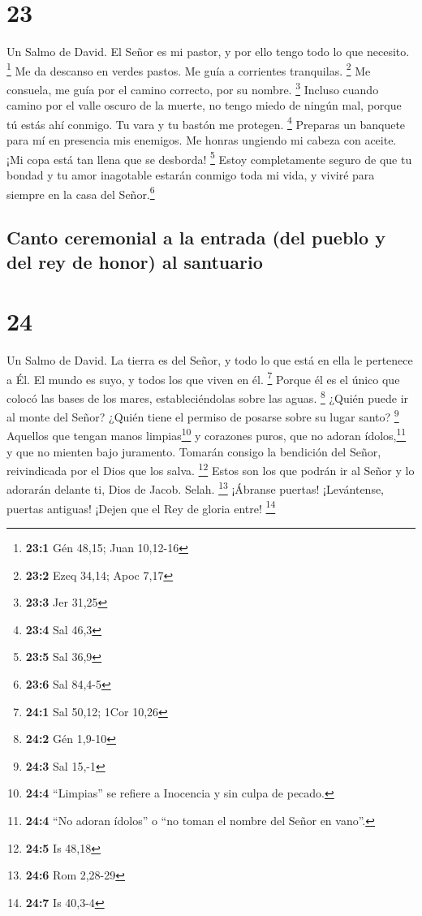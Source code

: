 \hypertarget{section-22}{%
\section{23}\label{section-22}}

Un Salmo de David.  El Señor es mi pastor, y por ello
tengo todo lo que necesito. \footnote{\textbf{23:1} Gén 48,15; Juan
  10,12-16}  Me da descanso en verdes pastos. Me guía a
corrientes tranquilas. \footnote{\textbf{23:2} Ezeq 34,14; Apoc 7,17}
 Me consuela, me guía por el camino correcto, por su
nombre. \footnote{\textbf{23:3} Jer 31,25}  Incluso cuando
camino por el valle oscuro de la muerte, no tengo miedo de ningún mal,
porque tú estás ahí conmigo. Tu vara y tu bastón me protegen.
\footnote{\textbf{23:4} Sal 46,3}  Preparas un banquete
para mí en presencia mis enemigos. Me honras ungiendo mi cabeza con
aceite. ¡Mi copa está tan llena que se desborda! \footnote{\textbf{23:5}
  Sal 36,9}  Estoy completamente seguro de que tu bondad y
tu amor inagotable estarán conmigo toda mi vida, y viviré para siempre
en la casa del Señor.\footnote{\textbf{23:6} Sal 84,4-5}

\hypertarget{canto-ceremonial-a-la-entrada-del-pueblo-y-del-rey-de-honor-al-santuario}{%
\subsection{Canto ceremonial a la entrada (del pueblo y del rey de
honor) al
santuario}\label{canto-ceremonial-a-la-entrada-del-pueblo-y-del-rey-de-honor-al-santuario}}

\hypertarget{section-23}{%
\section{24}\label{section-23}}

Un Salmo de David.  La tierra es del Señor, y todo lo que
está en ella le pertenece a Él. El mundo es suyo, y todos los que viven
en él. \footnote{\textbf{24:1} Sal 50,12; 1Cor 10,26} 
Porque él es el único que colocó las bases de los mares,
estableciéndolas sobre las aguas. \footnote{\textbf{24:2} Gén 1,9-10}
 ¿Quién puede ir al monte del Señor? ¿Quién tiene el
permiso de posarse sobre su lugar santo? \footnote{\textbf{24:3} Sal
  15,-1}  Aquellos que tengan manos limpias\footnote{\textbf{24:4}
  ``Limpias'' se refiere a Inocencia y sin culpa de pecado.} y corazones
puros, que no adoran ídolos,\footnote{\textbf{24:4} ``No adoran ídolos''
  o ``no toman el nombre del Señor en vano''.} y que no mienten bajo
juramento.  Tomarán consigo la bendición del Señor,
reivindicada por el Dios que los salva. \footnote{\textbf{24:5} Is 48,18}
 Estos son los que podrán ir al Señor y lo adorarán
delante ti, Dios de Jacob. Selah. \footnote{\textbf{24:6} Rom 2,28-29}
 ¡Ábranse puertas! ¡Levántense, puertas antiguas! ¡Dejen
que el Rey de gloria entre! \footnote{\textbf{24:7} Is 40,3-4}

